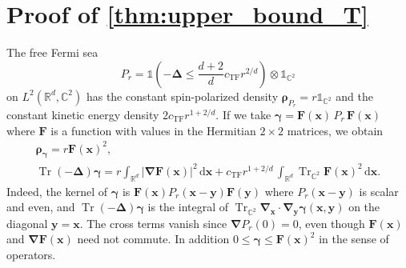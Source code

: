 \documentclass[final,reqno]{amsart}
\theoremstyle{remark}
\renewcommand{\le}{\leqslant}
\DeclareMathOperator{\Tr}{Tr}
\newcommand{\Trs}{\Tr_{\CC^2}}
\newcommand{\RR}{\mathbb{R}}
\newcommand{\CC}{\mathbb{C}}
\newcommand{\TF}{\mathrm{TF}}
\newcommand{\iden}{\mathbb{1}}
\newcommand{\lapl}{\bm{\Delta}}
\newcommand{\grad}{\bm{\nabla}}
\newcommand{\dd}{\mathrm{d}}
\begin{document}
\section{Proof of \texorpdfstring{\cref{thm:upper_bound_T}}{the kinetic energy upper bound}}\label{app:upper_bound_T}
The free Fermi sea
$$
P_r=\iden\left(-\lapl\le \frac{d+2}d c_\TF r^{2/d}\right)\otimes\iden_{\CC^2}
$$
on $L^2(\RR^d,\CC^2)$ has the constant spin-polarized density $\bm{\rho}_{P_r}=r\iden_{\CC^2}$ and the constant kinetic energy density $2c_\TF r^{1+2/d}$. If we take
$\bm{\gamma}=\mathbf{F}(\mathbf{x})\,P_r\,\mathbf{F}(\mathbf{x})$
where $\mathbf{F}$ is a function with values in the Hermitian $2\times2$ matrices, we obtain
\begin{equation}\label{eq:computation_simple_trial_state}
\begin{gathered}
\bm{\rho}_{\bm{\gamma}}=r\mathbf{F}(\mathbf{x})^2,\\
\Tr(-\lapl)\bm{\gamma}=r\int_{\RR^d}|\grad \mathbf{F}(\mathbf{x})|^2\,\dd \mathbf{x}+c_\TF r^{1+2/d}\,\int_{\RR^d}\Trs \mathbf{F}(\mathbf{x})^2\,\dd \mathbf{x}.
\end{gathered}
\end{equation}
Indeed, the kernel of $\bm{\gamma}$ is $\mathbf{F}(\mathbf{x})P_r(\mathbf{x}-\mathbf{y})\mathbf{F}(\mathbf{y})$ where $P_r(\mathbf{x}-\mathbf{y})$ is scalar and even, and $\Tr(-\lapl)\bm{\gamma}$ is the integral of $\Trs\grad_{\mathbf{x}}\cdot\grad_{\mathbf{y}}\bm{\gamma}(\mathbf{x},\mathbf{y})$ on the diagonal $\mathbf{y}=\mathbf{x}$. The cross terms vanish since $\grad P_r(0)=0$, even though $\mathbf{F}(\mathbf{x})$ and $\grad \mathbf{F}(\mathbf{x})$ need not commute. In addition $0\le\bm{\gamma}\le \mathbf{F}(\mathbf{x})^2$ in the sense of operators.
\end{document}
